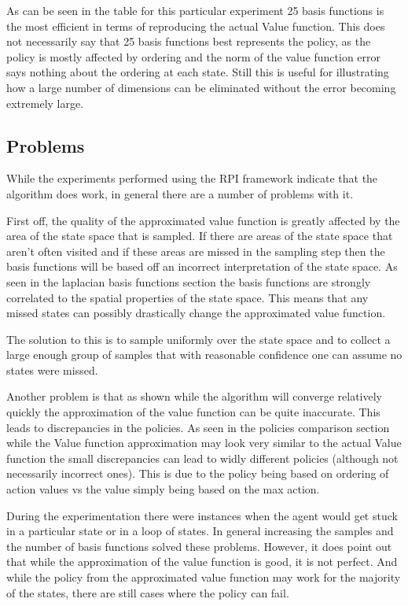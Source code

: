 \documentclass[12pt, letterpaper, final]{report}
\begin{document}
As can be seen in the table for this particular experiment 25 basis
functions is the most efficient in terms of reproducing the actual
Value function. This does not necessarily say that 25 basis functions
best represents the policy, as the policy is mostly affected by
ordering and the norm of the value function error says nothing about
the ordering at each state. Still this is useful for illustrating how
a large number of dimensions can be eliminated without the error
becoming extremely large. 

\subsection*{Problems}

While the experiments performed using the RPI framework indicate that
the algorithm does work, in general there are a number of problems with
it.

First off, the quality of the approximated value function is greatly
affected by the area of the state space that is sampled. If there are
areas of the state space that aren't often visited and if these areas
are missed in the sampling step then the basis functions will be based
off an incorrect interpretation of the state space. As seen in the
laplacian basis functions section the basis functions are strongly
correlated to the spatial properties of the state space. This means
that any missed states can possibly drastically change the
approximated value function.

The solution to this is to sample uniformly over the state space and
to collect a large enough group of samples that with reasonable
confidence one can assume no states were missed.

Another problem is that as shown while the algorithm will converge
relatively quickly the approximation of the value function can be
quite inaccurate. This leads to discrepancies in the policies. As seen
in the policies comparison section while the Value function
approximation may look very similar to the actual Value function the
small discrepancies can lead to widly different policies (although not
necessarily incorrect ones). This is due to the policy being based on
ordering of action values vs the value simply being based on the max action.

During the experimentation there were
instances when the agent would get stuck in a particular state or in a
loop of states. In general increasing the samples and the number of
basis functions solved these problems. However, it does point out that
while the approximation of the value function is good, it is not
perfect. And while the policy from the approximated value function may
work for the majority of the states, there are still cases where the
policy can fail.
\end{document}
